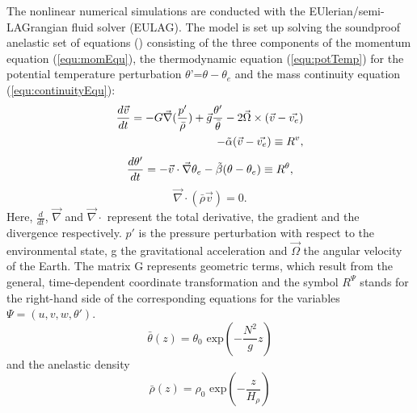 The nonlinear numerical simulations are conducted with the EUlerian/semi- LAGrangian fluid solver (EULAG). The model is set up solving the soundproof anelastic set of equations (\cite{lipps_scale_1982}) consisting of the three components of the momentum equation (\ref{equ:momEqu}), the thermodynamic equation (\ref{equ:potTemp}) for the potential temperature perturbation $\theta$'=$\theta-\theta_e$ and the mass continuity equation (\ref{equ:continuityEqu}):
%
\begin{equation}
\begin{aligned}
    \frac{d \Vec{v}}{dt} = -G \Vec{\nabla} (\frac{p'}{\bar{\rho}}) +  \Vec{g} \frac{\theta'}{\bar{\theta}} - 2 \Vec{\Omega} \times (\Vec{v}-\Vec{v_e}) \\
    - \Tilde{\alpha} (\Vec{v}-\Vec{v_e}) \equiv R^{v},
    \label{equ:momEqu}
\end{aligned}
\end{equation}
%
\begin{equation}
    \frac{d \theta'}{dt} = -\Vec{v} \cdot \Vec{\nabla} \theta_e - \Tilde{\beta} (\theta-\theta_e) \equiv R^{\theta},
    \label{equ:potTemp}
\end{equation}
%
\begin{equation}
    \Vec{\nabla} \cdot (\bar{\rho} \Vec{v}) = 0.
    \label{equ:continuityEqu}
\end{equation}
%
Here, $\frac{d}{dt}$, $\Vec{\nabla}$ and $\Vec{\nabla} \cdot$ represent the total derivative, the gradient and the divergence respectively. $p'$ is the pressure perturbation with respect to the environmental state, g the gravitational acceleration and $\Vec{\Omega}$ the angular velocity of the Earth. The matrix G represents geometric terms, which result from the general, time-dependent coordinate transformation and the symbol $R^{\Psi}$ stands for the right-hand side of the corresponding equations for the variables $\Psi = (u,v,w,\theta')$.
%
\begin{equation}
    \bar{\theta}(z) = \theta_0 \textrm{ exp}(-\frac{N^2}{g} z) 
    \label{equ:thetaScale}
\end{equation}
%
and the anelastic density 
%
\begin{equation}
    \bar{\rho}(z) = \rho_0 \textrm{ exp}(-\frac{z}{H_{\rho}})
    \label{equ:densityScale}
\end{equation}
